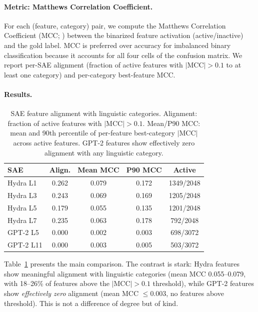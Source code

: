 \documentclass[11pt]{article}
\begin{document}
\paragraph{Metric: Matthews Correlation Coefficient.}
For each (feature, category) pair, we compute the Matthews Correlation 
Coefficient (MCC; \citealt{matthews1975comparison}) between the binarized 
feature activation (active/inactive) and the gold label. MCC is preferred 
over accuracy for imbalanced binary classification because it accounts for 
all four cells of the confusion matrix. We report per-SAE alignment 
(fraction of active features with $|\text{MCC}| > 0.1$ to at least one 
category) and per-category best-feature MCC.

\paragraph{Results.}

\begin{table}[t]
\centering
\small
\begin{tabular}{@{}lcccc@{}}
\toprule
\textbf{SAE} & \textbf{Align.} & \textbf{Mean MCC} & \textbf{P90 MCC} & \textbf{Active} \\
\midrule
Hydra L1 & 0.262 & 0.079 & 0.172 & 1349/2048 \\
Hydra L3 & 0.243 & 0.069 & 0.169 & 1205/2048 \\
Hydra L5 & 0.179 & 0.055 & 0.135 & 1201/2048 \\
Hydra L7 & 0.235 & 0.063 & 0.178 & 792/2048 \\
\midrule
GPT-2 L5  & 0.000 & 0.002 & 0.003 & 698/3072 \\
GPT-2 L11 & 0.000 & 0.003 & 0.005 & 503/3072 \\
\bottomrule
\end{tabular}
\caption{SAE feature alignment with linguistic categories. Alignment: 
fraction of active features with $|\text{MCC}| > 0.1$. Mean/P90 MCC: 
mean and 90th percentile of per-feature best-category $|\text{MCC}|$ 
across active features. GPT-2 features show effectively zero alignment 
with any linguistic category.}
\label{tab:sae}
\end{table}

Table~\ref{tab:sae} presents the main comparison. The contrast is stark: 
Hydra features show meaningful alignment with linguistic categories (mean 
MCC 0.055--0.079, with 18--26\% of features above the $|\text{MCC}| > 0.1$ 
threshold), while GPT-2 features show \emph{effectively zero} alignment 
(mean MCC $\leq 0.003$, no features above threshold). This is not a 
difference of degree but of kind.
\end{document}
